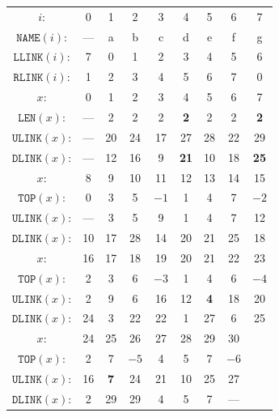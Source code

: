 \documentclass[a4paper,landscape,11pt]{article}
\begin{document}
\begin{figure}[H]
	\centering
	\begin{tabular}{c c c c c c c c c }
		\hline
		$i$:                 & 0   & 1          & 2    & 3    & 4           & 5          & 6    & 7           \\
		$\texttt{NAME}(i)$:  & --- & a          & b    & c    & d           & e          & f    & g           \\
		$\texttt{LLINK}(i)$: & 7   & 0          & 1    & 2    & 3           & 4          & 5    & 6           \\
		$\texttt{RLINK}(i)$: & 1   & 2          & 3    & 4    & 5           & 6          & 7    & 0           \\
		\hline
		$x$:                 & 0   & 1          & 2    & 3    & 4           & 5          & 6    & 7           \\
		$\texttt{LEN}(x)$:   & --- & 2          & 2    & 2    & \textbf{2}  & 2          & 2    & \textbf{2}  \\
		$\texttt{ULINK}(x)$: & --- & 20         & 24   & 17   & 27          & 28         & 22   & 29          \\
		$\texttt{DLINK}(x)$: & --- & 12         & 16   & 9    & \textbf{21} & 10         & 18   & \textbf{25} \\
		\hline
		$x$:                 & 8   & 9          & 10   & 11   & 12          & 13         & 14   & 15          \\
		$\texttt{TOP}(x)$:   & 0   & 3          & 5    & $-1$ & 1           & 4          & 7    & $-2$        \\
		$\texttt{ULINK}(x)$: & --- & 3          & 5    & 9    & 1           & 4          & 7    & 12          \\
		$\texttt{DLINK}(x)$: & 10  & 17         & 28   & 14   & 20          & 21         & 25   & 18          \\
		\hline
		$x$:                 & 16  & 17         & 18   & 19   & 20          & 21         & 22   & 23          \\
		$\texttt{TOP}(x)$:   & 2   & 3          & 6    & $-3$ & 1           & 4          & 6    & $-4$        \\
		$\texttt{ULINK}(x)$: & 2   & 9          & 6    & 16   & 12          & \textbf{4} & 18   & 20          \\
		$\texttt{DLINK}(x)$: & 24  & 3          & 22   & 22   & 1           & 27         & 6    & 25          \\
		\hline
		$x$:                 & 24  & 25         & 26   & 27   & 28          & 29         & 30   &             \\
		$\texttt{TOP}(x)$:   & 2   & 7          & $-5$ & 4    & 5           & 7          & $-6$ &             \\
		$\texttt{ULINK}(x)$: & 16  & \textbf{7} & 24   & 21   & 10          & 25         & 27   &             \\
		$\texttt{DLINK}(x)$: & 2   & 29         & 29   & 4    & 5           & 7          & ---  &             \\
	\end{tabular}
\end{figure}
\end{document}

